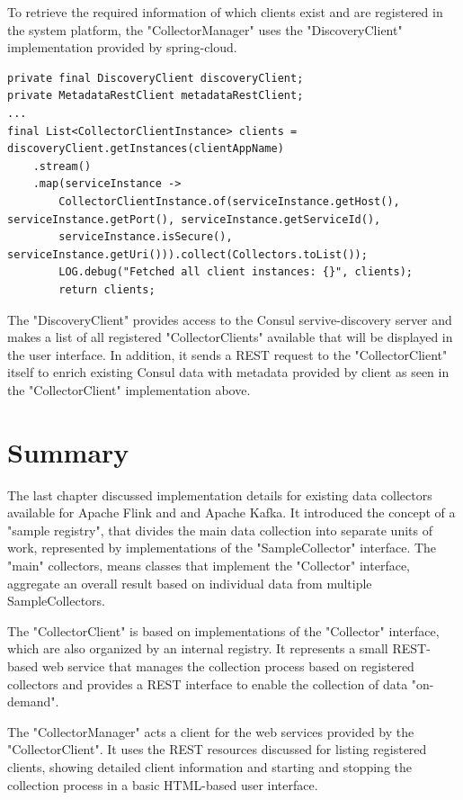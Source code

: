 To retrieve the required information of which clients exist and are registered in the system platform, the "CollectorManager"
uses the "DiscoveryClient" implementation provided by spring-cloud.

\begin{lstlisting}[caption={"CollectorClientInstanceService", Get client instances}, captionpos=b, label={lst:client-instance-service}]
private final DiscoveryClient discoveryClient;
private MetadataRestClient metadataRestClient;
...
final List<CollectorClientInstance> clients = discoveryClient.getInstances(clientAppName)
    .stream()
    .map(serviceInstance ->
        CollectorClientInstance.of(serviceInstance.getHost(), serviceInstance.getPort(), serviceInstance.getServiceId(),
        serviceInstance.isSecure(), serviceInstance.getUri())).collect(Collectors.toList());
        LOG.debug("Fetched all client instances: {}", clients);
        return clients;
\end{lstlisting}

The "DiscoveryClient" provides access to the Consul servive-discovery server and makes a list of all registered "CollectorClients"
available that will be displayed in the user interface. In addition, it sends a REST request to the "CollectorClient" itself to enrich
existing Consul data with metadata provided by client as seen in the "CollectorClient" implementation above.

\section{Summary}

The last chapter discussed implementation details for existing data collectors available for Apache Flink and and Apache Kafka.
It introduced the concept of a "sample registry", that divides the main data collection into separate units of work, represented
by implementations of the "SampleCollector" interface. The "main" collectors, means classes that implement the "Collector"
interface, aggregate an overall result based on individual data from multiple SampleCollectors.

The "CollectorClient" is based on implementations of the "Collector" interface, which are also organized by an internal registry.
It represents a small REST-based web service that manages the collection process based on registered collectors and provides a REST
interface to enable the collection of data "on-demand".

The "CollectorManager" acts a client for the web services provided by the "CollectorClient". It uses the REST resources discussed
for listing registered clients, showing detailed client information and starting and stopping the collection process in a basic
HTML-based user interface.

